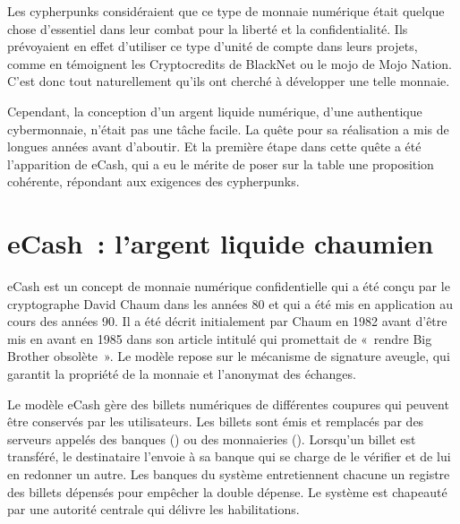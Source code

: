 Les cypherpunks considéraient que ce type de monnaie numérique était quelque chose d'essentiel dans leur combat pour la liberté et la confidentialité. Ils prévoyaient en effet d'utiliser ce type d'unité de compte dans leurs projets, comme en témoignent les Cryptocredits de BlackNet ou le mojo de Mojo Nation. C'est donc tout naturellement qu'ils ont cherché à développer une telle monnaie.

Cependant, la conception d'un argent liquide numérique, d'une authentique cybermonnaie, n'était pas une tâche facile. La quête pour sa réalisation a mis de longues années avant d'aboutir. Et la première étape dans cette quête a été l'apparition de eCash, qui a eu le mérite de poser sur la table une proposition cohérente, répondant aux exigences des cypherpunks.

\section*{eCash~: l'argent liquide chaumien}

eCash est un concept de monnaie numérique confidentielle qui a été conçu par le cryptographe David Chaum dans les années 80 et qui a été mis en application au cours des années 90. Il a été décrit initialement par Chaum en 1982 avant d'être mis en avant en 1985 dans son article intitulé  qui promettait de «~rendre Big Brother obsolète~». Le modèle repose sur le mécanisme de signature aveugle, qui garantit la propriété de la monnaie et l'anonymat des échanges.

Le modèle eCash gère des billets numériques de différentes coupures qui peuvent être conservés par les utilisateurs. Les billets sont émis et remplacés par des serveurs appelés des banques () ou des monnaieries (). Lorsqu'un billet est transféré, le destinataire l'envoie à sa banque qui se charge de le vérifier et de lui en redonner un autre. Les banques du système entretiennent chacune un registre des billets dépensés pour empêcher la double dépense. Le système est chapeauté par une autorité centrale qui délivre les habilitations.

